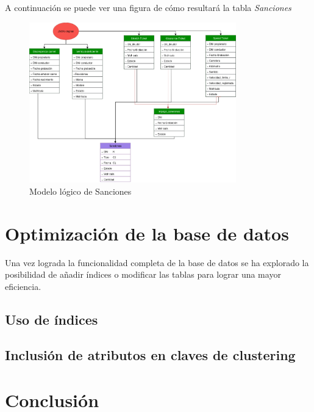 \documentclass[]{article}
\begin{document}
A continuación se puede ver una figura de cómo resultará la tabla \textit{Sanciones}
\begin{figure}[H]
    \centering
    \includegraphics[width=0.8\textwidth]{./imagenes/Sanciones.png}
    \caption{Modelo lógico de Sanciones}
    \label{fig:modelo_sanciones}
\end{figure}

\section{Optimización de la base de datos}
\label{sec:optimusprime}
Una vez lograda la funcionalidad completa de la base de datos se ha explorado la posibilidad de añadir índices o modificar las tablas para lograr una mayor eficiencia.

\subsection{Uso de índices}

\subsection{Inclusión de atributos en claves de clustering}


\newpage
\section{Conclusión}
\label{sec:conclusion}
\end{document}
